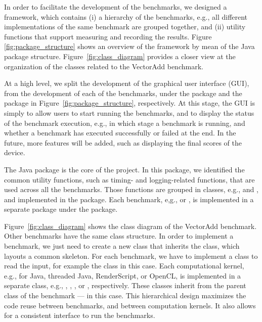 In order to facilitate the development of the benchmarks, we designed a
framework,  which contains (i) a hierarchy of the benchmarks, e.g.,
all different implementations of the same benchmark are grouped together, and
(ii) utility functions that support measuring and recording the results.
Figure \ref{fig:package_structure} shows an overview of the framework by mean
of the Java package structure. Figure~\ref{fig:class_diagram} provides a closer
view at the organization of the classes related to the VectorAdd benchmark.

At a high level, we split the development of the graphical user interface (GUI),
from the development of each of the benchmarks, under the  package and
the  package in Figure~\ref{fig:package_structure}, respectively.
At this stage, the GUI is simply to allow users to start running the benchmarks,
and to display the status of the benchmark execution, e.g., in which stage a
benchmark is running, and whether a benchmark has executed successfully or
failed at the end. In the future, more features will be added, such as
displaying the final scores of the device.

The  Java package is the core of the project. In this package, we
identified the common utility functions, such as timing- and logging-related
functions, that are used across all the benchmarks. Those functions are grouped
in classes, e.g.,  and , and implemented in the
 package. Each benchmark, e,g.,  or , is
implemented in a separate package under the  package. 

Figure~\ref{fig:class_diagram} shows the class diagram of the VectorAdd benchmark.
Other benchmarks have the same class structure. In order to implement a
benchmark, we just need to create a new class that inherits the  class, which
layouts a common skeleton. For each benchmark, we have to implement a class to
read the input, for example the  class in this case. Each
computational kernel, e.g., for Java, threaded Java, RenderScript, or OpenCL, is
implemented in a separate class, e.g., ,
, , or ,
respectively. These classes inherit from the parent class of the benchmark ---
 in this case. This hierarchical design
maximizes the code reuse between benchmarks, and between computation kernels.  It
also allows for a consistent interface to run the benchmarks.


